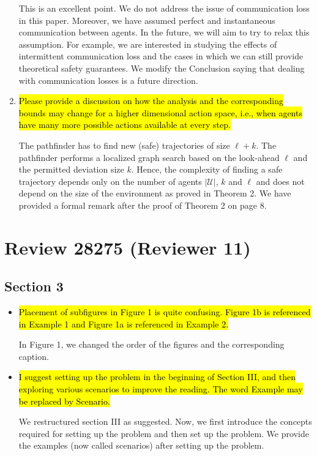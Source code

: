 \documentclass{article}[12pt]
\begin{document}
\begin{enumerate}
This is an excellent point. We do not address the issue of communication loss in this paper. Moreover, we have assumed perfect and instantaneous communication between agents. In the future, we will aim to try to relax this assumption. For example, we are interested in studying the effects of intermittent communication loss and the cases in which we can still provide theoretical safety guarantees. 
We modify the Conclusion saying that dealing with communication losses is a future direction.

\item \hl{Please provide a discussion on how the analysis and the corresponding bounds may change for a higher dimensional action space, i.e., when agents have many more possible actions available at every step. }

The pathfinder has to find new (safe) trajectories of size $\ell + k$. The pathfinder performs a localized graph search based on the look-ahead $\ell$ and the permitted deviation size $k$. Hence, the complexity of finding a safe trajectory depends only on the number of agents $|\mathcal{U}|$, $k$ and $\ell$ and does not depend on the size of the environment as proved in Theorem 2. We have provided a formal remark after the proof of Theorem 2 on page 8.

\end{enumerate} 

\section{Review 28275 (Reviewer 11)}

\subsection*{Section 3}

\begin{itemize}

\item \hl{Placement of subfigures in Figure 1 is quite confusing. Figure 1b is referenced in Example 1 and Figure 1a is referenced in Example 2.}

In Figure 1, we changed the order of the figures and the corresponding caption.
 
\item \hl{I suggest setting up the problem in the beginning of Section III, and then exploring various scenarios to improve the reading. The word Example may be replaced by Scenario.}
	
We restructured section III as suggested. Now, we first introduce the concepts required for setting up the problem and then set up the problem. We provide the examples (now called scenarios) after setting up the problem.

\end{itemize}
\end{document}
